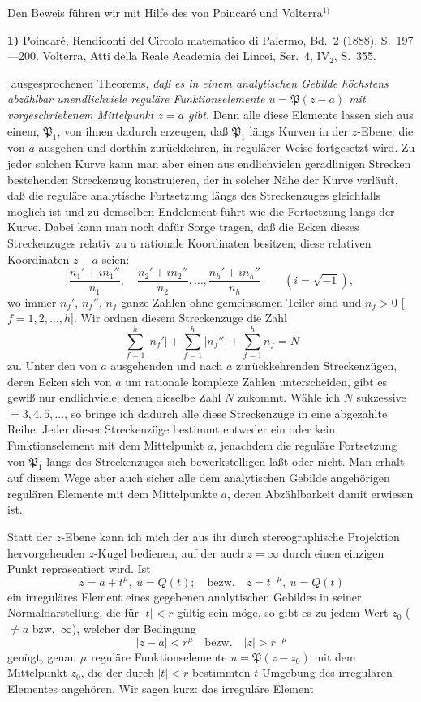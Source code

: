 \documentclass{article}
\begin{document}
Den Beweis führen wir mit Hilfe des von Poincaré und Volterra${}^{1)}$

\textbf{1)} Poincaré, Rendiconti del Circolo matematico di Palermo, Bd.\ 2 (1888), S.\ 197---200. Volterra, Atti della Reale Academia dei Lincei, Ser.\ 4, $\mathrm{IV}_2$, S.\ 355.

﻿
ausgesprochenen Theorems, \emph{daß es in einem analytischen Gebilde höchstens abzählbar unendlichviele reguläre Funktionselemente $u = \mathfrak{P}(z - a)$ mit vorgeschriebenem Mittelpunkt $z = a$ gibt.} Denn alle diese Elemente lassen sich aus einem, $\mathfrak{P}_1$, von ihnen dadurch erzeugen, daß $\mathfrak{P}_1$ längs Kurven in der $z$-Ebene, die von $a$ ausgehen und dorthin zurückkehren, in regulärer Weise fortgesetzt wird. Zu jeder solchen Kurve kann man aber einen aus endlichvielen geradlinigen Strecken bestehenden Streckenzug konstruieren, der in solcher Nähe der Kurve verläuft, daß die reguläre analytische Fortsetzung längs des Streckenzuges gleichfalls möglich ist und zu demselben Endelement führt wie die Fortsetzung längs der Kurve. Dabei kann man noch dafür Sorge tragen, daß die Ecken dieses Streckenzuges relativ zu $a$ rationale Koordinaten besitzen; diese relativen Koordinaten $z - a$ seien:
\[ \frac{n_1' + i n_1''}{n_1}, \quad \frac{n_2' + i n_2''}{n_2}, \dots, \frac{n_h' + i n_h''}{n_h} \qquad (i = \sqrt{-1}), \]
wo immer $n_f'$, $n_f''$, $n_f$ ganze Zahlen ohne gemeinsamen Teiler sind und $n_f > 0$ [$f = 1, 2, \dots, h$]. Wir ordnen diesem Streckenzuge die Zahl
\[ \sum_{f=1}^h |n_f'| + \sum_{f=1}^h |n_f''| + \sum_{f=1}^h n_f = N \]
zu. Unter den von $a$ ausgehenden und nach $a$ zurückkehrenden Streckenzügen, deren Ecken sich von $a$ um rationale komplexe Zahlen unterscheiden, gibt es gewiß nur endlichviele, denen dieselbe Zahl $N$ zukommt. Wähle ich $N$ sukzessive $= 3, 4, 5, \dots$, so bringe ich dadurch alle diese Streckenzüge in eine abgezählte Reihe. Jeder dieser Streckenzüge bestimmt entweder ein oder kein Funktionselement mit dem Mittelpunkt $a$, jenachdem die reguläre Fortsetzung von $\mathfrak{P}_1$ längs des Streckenzuges sich bewerkstelligen läßt oder nicht. Man erhält auf diesem Wege aber auch sicher alle dem analytischen Gebilde angehörigen regulären Elemente mit dem Mittelpunkte $a$, deren Abzählbarkeit damit erwiesen ist.

Statt der $z$-Ebene kann ich mich der aus ihr durch stereographische Projektion hervorgehenden $z$-Kugel bedienen, auf der auch $z = \infty$ durch einen einzigen Punkt repräsentiert wird. Ist
\[ z = a + t^\mu, \ u = Q(t); \quad \text{bezw.} \quad z = t^{-\mu}, \ u = Q(t) \]
ein irreguläres Element eines gegebenen analytischen Gebildes in seiner Normaldarstellung, die für $|t| < r$ gültig sein möge, so gibt es zu jedem Wert $z_0$ ($\neq a$ bzw.\ $\infty$), welcher der Bedingung
\[ |z - a| < r^\mu \quad \text{bezw.} \quad |z| > r^{-\mu} \tag{7} \]
genügt, genau $\mu$ reguläre Funktionselemente $u = \mathfrak{P}(z - z_0)$ mit dem Mittelpunkt $z_0$, die der durch $|t| < r$ bestimmten $t$-Umgebung des irregulären Elementes angehören. Wir sagen kurz: das irreguläre Element
\end{document}
